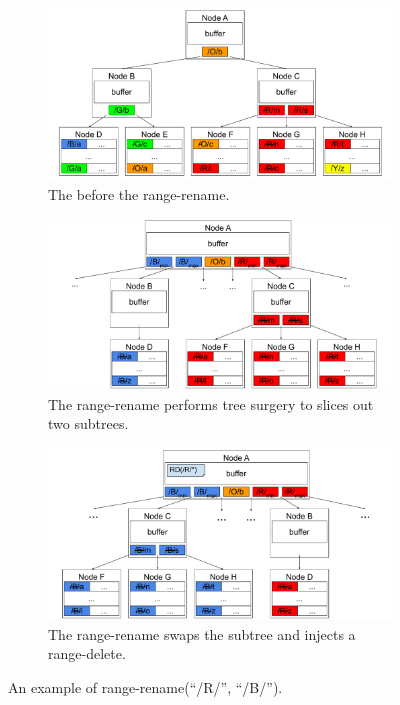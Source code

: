 \begin{figure}
    \begin{subfigure}{\textwidth}
        \centering
        \includegraphics[width=.7\linewidth]{fig/rr-1}
        \caption{\label{subfig:rr-1} The \bet before the range-rename.}
    \end{subfigure}
    \begin{subfigure}{\textwidth}
        \centering
        \includegraphics[width=.7\linewidth]{fig/rr-2}
        \caption{\label{subfig:rr-2} The range-rename performs tree surgery
            to slices out two subtrees.}
    \end{subfigure}
    \begin{subfigure}{\textwidth}
        \centering
        \includegraphics[width=.7\linewidth]{fig/rr-3}
        \caption{\label{subfig:rr-3} The range-rename swaps the subtree and
            injects a range-delete.}
    \end{subfigure}
    \caption[A range-rename example]{\label{fig:rr}
        An example of range-rename(``/R/'', ``/B/'').}
\end{figure}

